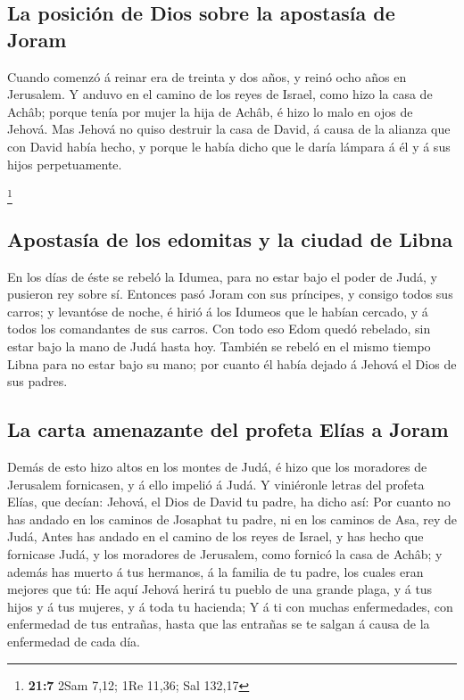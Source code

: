 \hypertarget{la-posiciuxf3n-de-dios-sobre-la-apostasuxeda-de-joram}{%
\subsection{La posición de Dios sobre la apostasía de
Joram}\label{la-posiciuxf3n-de-dios-sobre-la-apostasuxeda-de-joram}}

 Cuando comenzó á reinar era de treinta y dos años, y
reinó ocho años en Jerusalem.  Y anduvo en el camino de
los reyes de Israel, como hizo la casa de Achâb; porque tenía por mujer
la hija de Achâb, é hizo lo malo en ojos de Jehová.  Mas
Jehová no quiso destruir la casa de David, á causa de la alianza que con
David había hecho, y porque le había dicho que le daría lámpara á él y á
sus hijos perpetuamente.

\footnote{\textbf{21:7} 2Sam 7,12; 1Re 11,36; Sal 132,17}

\hypertarget{apostasuxeda-de-los-edomitas-y-la-ciudad-de-libna}{%
\subsection{Apostasía de los edomitas y la ciudad de
Libna}\label{apostasuxeda-de-los-edomitas-y-la-ciudad-de-libna}}

 En los días de éste se rebeló la Idumea, para no estar
bajo el poder de Judá, y pusieron rey sobre sí.  Entonces
pasó Joram con sus príncipes, y consigo todos sus carros; y levantóse de
noche, é hirió á los Idumeos que le habían cercado, y á todos los
comandantes de sus carros.  Con todo eso Edom quedó
rebelado, sin estar bajo la mano de Judá hasta hoy. También se rebeló en
el mismo tiempo Libna para no estar bajo su mano; por cuanto él había
dejado á Jehová el Dios de sus padres.

\hypertarget{la-carta-amenazante-del-profeta-eluxedas-a-joram}{%
\subsection{La carta amenazante del profeta Elías a
Joram}\label{la-carta-amenazante-del-profeta-eluxedas-a-joram}}

 Demás de esto hizo altos en los montes de Judá, é hizo
que los moradores de Jerusalem fornicasen, y á ello impelió á Judá.
 Y viniéronle letras del profeta Elías, que decían:
Jehová, el Dios de David tu padre, ha dicho así: Por cuanto no has
andado en los caminos de Josaphat tu padre, ni en los caminos de Asa,
rey de Judá,  Antes has andado en el camino de los reyes
de Israel, y has hecho que fornicase Judá, y los moradores de Jerusalem,
como fornicó la casa de Achâb; y además has muerto á tus hermanos, á la
familia de tu padre, los cuales eran mejores que tú:  He
aquí Jehová herirá tu pueblo de una grande plaga, y á tus hijos y á tus
mujeres, y á toda tu hacienda;  Y á ti con muchas
enfermedades, con enfermedad de tus entrañas, hasta que las entrañas se
te salgan á causa de la enfermedad de cada día.

